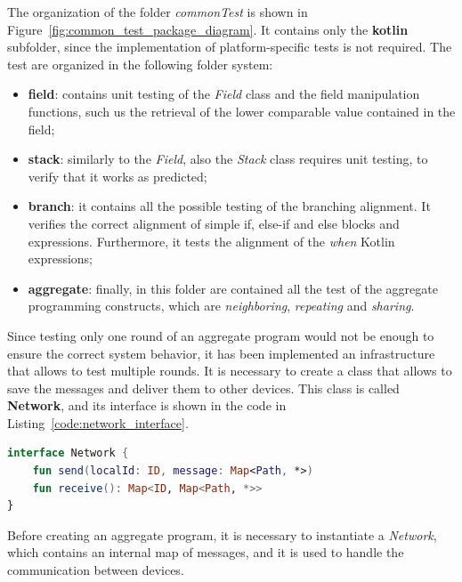 The organization of the folder \textit{commonTest} is shown in Figure~\ref{fig:common_test_package_diagram}. It contains only the \textbf{kotlin} subfolder, since the implementation of platform-specific tests is not required.\newline
The test are organized in the following folder system:
\begin{itemize}
    \item \textbf{field}: contains unit testing of the \textit{Field} class and the field manipulation functions, such us the retrieval of the lower comparable value contained in the field;
    \item \textbf{stack}: similarly to the \textit{Field}, also the \textit{Stack} class requires unit testing, to verify that it works as predicted;
    \item \textbf{branch}: it contains all the possible testing of the branching alignment. It verifies the correct alignment of simple if, else-if and else blocks and expressions. Furthermore, it tests the alignment of the \textit{when} Kotlin expressions;
    \item \textbf{aggregate}: finally, in this folder are contained all the test of the aggregate programming constructs, which are \textit{neighboring}, \textit{repeating} and \textit{sharing}.
\end{itemize}

Since testing only one round of an aggregate program would not be enough to ensure the correct system behavior, it has been implemented an infrastructure that allows to test multiple rounds.\newline
It is necessary to create a class that allows to save the messages and deliver them to other devices. This class is called \textbf{Network}, and its interface is shown in the code in Listing~\ref{code:network_interface}.
\begin{lstlisting}[caption={Network interface to simulate multiple round of an aggregate program in tests}, captionpos=b, language=Kotlin, label={code:network_interface}]
interface Network {
    fun send(localId: ID, message: Map<Path, *>)
    fun receive(): Map<ID, Map<Path, *>>
}
\end{lstlisting}
Before creating an aggregate program, it is necessary to instantiate a \textit{Network}, which contains an internal map of messages, and it is used to handle the communication between devices.

